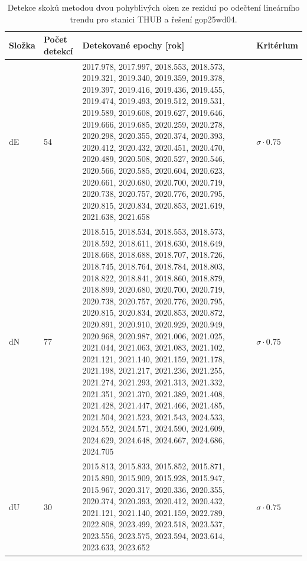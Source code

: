 \begin{table}[htbp]
\caption{Detekce skoků metodou dvou pohyblivých oken ze reziduí po odečtení lineárního trendu pro stanici THUB a řešení gop25wd04.}
\label{tab:gop25wd04_stcd_thub_detr_weighted_1seg_jumps_sliding_window}
\begin{tabular}{llll}
\toprule
Složka & Počet detekcí & Detekované epochy [rok] & Kritérium \\
\midrule
dE & 54 & 2017.978, 2017.997, 2018.553, 2018.573, 2019.321, 2019.340, 2019.359, 2019.378, 2019.397, 2019.416, 2019.436, 2019.455, 2019.474, 2019.493, 2019.512, 2019.531, 2019.589, 2019.608, 2019.627, 2019.646, 2019.666, 2019.685, 2020.259, 2020.278, 2020.298, 2020.355, 2020.374, 2020.393, 2020.412, 2020.432, 2020.451, 2020.470, 2020.489, 2020.508, 2020.527, 2020.546, 2020.566, 2020.585, 2020.604, 2020.623, 2020.661, 2020.680, 2020.700, 2020.719, 2020.738, 2020.757, 2020.776, 2020.795, 2020.815, 2020.834, 2020.853, 2021.619, 2021.638, 2021.658 & $\sigma \cdot 0.75$ \\
dN & 77 & 2018.515, 2018.534, 2018.553, 2018.573, 2018.592, 2018.611, 2018.630, 2018.649, 2018.668, 2018.688, 2018.707, 2018.726, 2018.745, 2018.764, 2018.784, 2018.803, 2018.822, 2018.841, 2018.860, 2018.879, 2018.899, 2020.680, 2020.700, 2020.719, 2020.738, 2020.757, 2020.776, 2020.795, 2020.815, 2020.834, 2020.853, 2020.872, 2020.891, 2020.910, 2020.929, 2020.949, 2020.968, 2020.987, 2021.006, 2021.025, 2021.044, 2021.063, 2021.083, 2021.102, 2021.121, 2021.140, 2021.159, 2021.178, 2021.198, 2021.217, 2021.236, 2021.255, 2021.274, 2021.293, 2021.313, 2021.332, 2021.351, 2021.370, 2021.389, 2021.408, 2021.428, 2021.447, 2021.466, 2021.485, 2021.504, 2021.523, 2021.543, 2024.533, 2024.552, 2024.571, 2024.590, 2024.609, 2024.629, 2024.648, 2024.667, 2024.686, 2024.705 & $\sigma \cdot 0.75$ \\
dU & 30 & 2015.813, 2015.833, 2015.852, 2015.871, 2015.890, 2015.909, 2015.928, 2015.947, 2015.967, 2020.317, 2020.336, 2020.355, 2020.374, 2020.393, 2020.412, 2020.432, 2021.121, 2021.140, 2021.159, 2022.789, 2022.808, 2023.499, 2023.518, 2023.537, 2023.556, 2023.575, 2023.594, 2023.614, 2023.633, 2023.652 & $\sigma \cdot 0.75$ \\
\bottomrule
\end{tabular}
\end{table}
